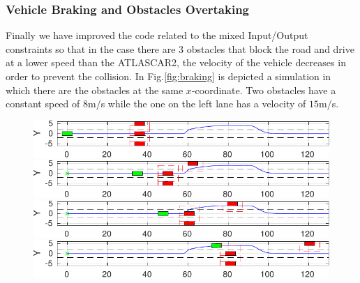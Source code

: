 \documentclass[conference, 11pt]{IEEEtran}
\begin{document}
\subsubsection{Vehicle Braking and Obstacles Overtaking}
Finally we have improved the code related to the mixed Input/Output constraints so that in the case there are 3 obstacles that block the road and drive at a lower speed than the ATLASCAR2, the velocity of the vehicle decreases in order to prevent the collision. In Fig.\ref{fig:braking} is depicted a simulation in which there are the obstacles at the same $x$-coordinate. Two obstacles have a constant speed of $8$m/s while the one on the left lane has a velocity of $15$m/s.
\begin{figure}[H]
	\centering
	\begin{minipage}[t]{\columnwidth}
		\includegraphics[width=1\columnwidth]{../../MATLAB/three_obstacles_no_overtaking/figure/braking_0.pdf}
	\end{minipage}
	\begin{minipage}[t]{\columnwidth}
		\includegraphics[width=1\columnwidth]{../../MATLAB/three_obstacles_no_overtaking/figure/braking_1.pdf}
	\end{minipage}
	\begin{minipage}[t]{\columnwidth}
		\includegraphics[width=1\columnwidth]{../../MATLAB/three_obstacles_no_overtaking/figure/braking_2.pdf}
	\end{minipage}
	\begin{minipage}[t]{\columnwidth}
		\includegraphics[width=1\columnwidth]{../../MATLAB/three_obstacles_no_overtaking/figure/braking_3.pdf}
	\end{minipage}
	\begin{minipage}[t]{\columnwidth}

\end{minipage}
\end{figure}
\end{document}
